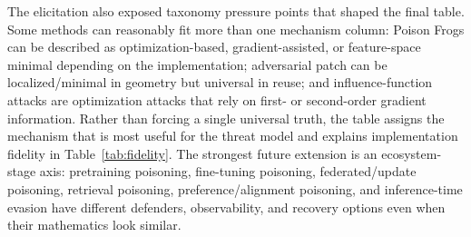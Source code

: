 \documentclass[conference]{IEEEtran}
\begin{document}
The elicitation also exposed taxonomy pressure points that shaped the final table. Some methods can reasonably fit more than one mechanism column: Poison Frogs can be described as optimization-based, gradient-assisted, or feature-space minimal depending on the implementation; adversarial patch can be localized/minimal in geometry but universal in reuse; and influence-function attacks are optimization attacks that rely on first- or second-order gradient information. Rather than forcing a single universal truth, the table assigns the mechanism that is most useful for the threat model and explains implementation fidelity in Table~\ref{tab:fidelity}. The strongest future extension is an ecosystem-stage axis: pretraining poisoning, fine-tuning poisoning, federated/update poisoning, retrieval poisoning, preference/alignment poisoning, and inference-time evasion have different defenders, observability, and recovery options even when their mathematics look similar.
\end{document}
